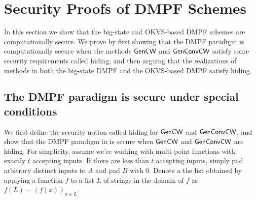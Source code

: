 \section{Security Proofs of DMPF Schemes}\label{sec:security_proof}
In this section we show that the big-state and OKVS-based DMPF schemes are computationally secure. We prove by first showing that the DMPF paradigm is computationally secure when the methods $\sf  GenCW$ and $\sf GenConvCW$ satisfy some security requirements called hiding, and then arguing that the realizations of methods in both the big-state DMPF and the OKVS-based DMPF satisfy hiding. 

\subsection{The DMPF paradigm is secure under special conditions}\label{sec:paradigm_security_proof}
We first define the security notion called hiding for ${\sf Gen}{\sf CW}$ and ${\sf Gen}{\sf Conv}{\sf CW}$, and show that the DMPF paradigm in  is secure when ${\sf Gen}{\sf CW}$ and ${\sf Gen}{\sf Conv}{\sf CW}$ are hiding. For simplicity, assume we're working with multi-point functions with exactly $t$ accepting inputs. If there are less than $t$ accepting inputs, simply pad arbitrary distinct inputs to $A$ and pad $B$ with $0$. Denote a the list obtained by applying a function $f$ to a list $L$ of strings in the domain of $f$ as $f(L) = (f(x))_{x\in L}$. 

